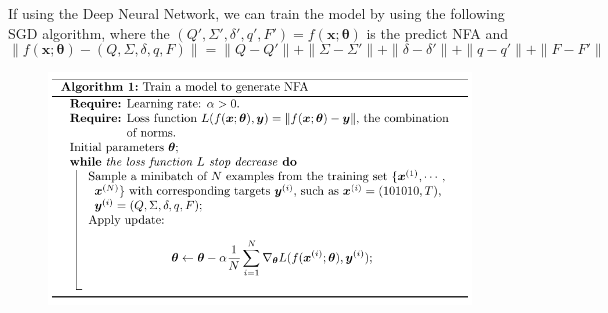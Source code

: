 \documentclass{article}
\begin{document}
If using the Deep Neural Network, we can train the model by using the following SGD algorithm, where the $(Q', \Sigma', \delta', q', F') = f(\boldsymbol{x}; \boldsymbol{\theta})$ is the predict NFA and 
\begin{equation*}
    \| f(\boldsymbol{x}; \boldsymbol{\theta}) - (Q, \Sigma, \delta, q, F) \| = 
    \| Q - Q' \| + \| \Sigma - \Sigma' \| + \| \delta - \delta' \| + \| q - q' \| + \| F - F' \| 
\end{equation*}
\begin{figure}[H]
    \centering
    \includegraphics[width=0.75\linewidth]{src/train_loop.pdf}
    \label{alg: train loop}
\end{figure}
\end{document}
